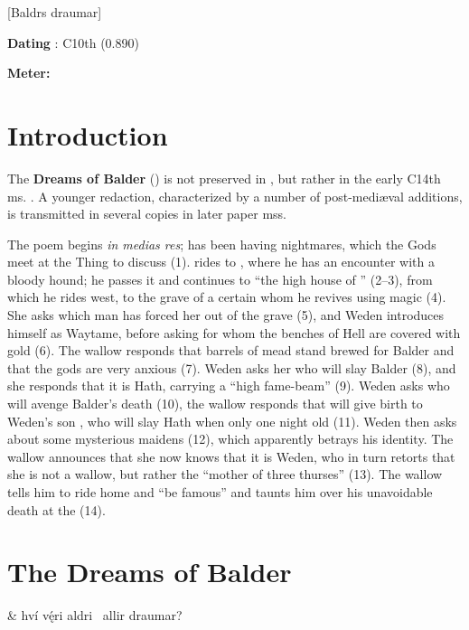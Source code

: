 [Baldrs draumar]
\def\thisBookCode{Baldrsdraumar}

\begin{flushright}%
\textbf{Dating} \parencite{Sapp2022}: C10th (0.890)

\textbf{Meter:} \Fornyrdislag%
\end{flushright}

\section{Introduction}

The \textbf{Dreams of Balder} (\Baldrsdraumar) is not preserved in \Regius, but rather in the early C14th ms. \AM.  A younger redaction, characterized by a number of post-mediæval additions, is transmitted in several copies in later paper mss.

The poem begins \emph{in medias res};  has been having nightmares, which the Gods meet at the Thing to discuss (1).   rides to , where he has an encounter with a bloody hound; he passes it and continues to “the high house of ” (2–3), from which he rides west, to the grave of a certain  whom he revives using magic (4). She asks which man has forced her out of the grave (5), and Weden introduces himself as Waytame, before asking for whom the benches of Hell are covered with gold (6). The wallow responds that barrels of mead stand brewed for Balder and that the gods are very anxious (7). Weden asks her who will slay Balder (8), and she responds that it is Hath, carrying a “high fame-beam” (9).  Weden asks who will avenge Balder’s death (10), the wallow responds that  will give birth to Weden’s son , who will slay Hath when only one night old (11).  Weden then asks about some mysterious maidens (12), which apparently betrays his identity.  The wallow announces that she now knows that it is Weden, who in turn retorts that she is not a wallow, but rather the “mother of three thurses” (13). The wallow tells him to ride home and “be famous” and taunts him over his unavoidable death at the  (14).

\section{The Dreams of Balder}

\bvg\bva{}%
 &
hví vę́ri aldri \hld\ allir draumar?\eva

